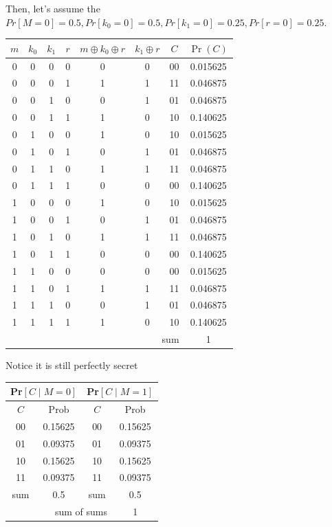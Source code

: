 Then, let's assume the $Pr[M = 0] = 0.5, Pr[k_0 = 0] = 0.5, Pr[k_1 = 0] = 0.25, Pr[r = 0] = 0.25$.

\begin{tabular}{|c|c|c|c|c|c|c|c|}
	\hline
	$m$ & $k_0$ & $k_1$ & $r$ & $m \oplus k_0 \oplus r$ & $k_1 \oplus r$ & $C$ & $\Pr(C)$ \\
	\hline
	0 & 0 & 0 & 0 & 0 & 0 & 00 & 0.015625 \\
	0 & 0 & 0 & 1 & 1 & 1 & 11 & 0.046875 \\
	0 & 0 & 1 & 0 & 0 & 1 & 01 & 0.046875 \\
	0 & 0 & 1 & 1 & 1 & 0 & 10 & 0.140625 \\
	0 & 1 & 0 & 0 & 1 & 0 & 10 & 0.015625 \\
	0 & 1 & 0 & 1 & 0 & 1 & 01 & 0.046875 \\
	0 & 1 & 1 & 0 & 1 & 1 & 11 & 0.046875 \\
	0 & 1 & 1 & 1 & 0 & 0 & 00 & 0.140625 \\
	1 & 0 & 0 & 0 & 1 & 0 & 10 & 0.015625 \\
	1 & 0 & 0 & 1 & 0 & 1 & 01 & 0.046875 \\
	1 & 0 & 1 & 0 & 1 & 1 & 11 & 0.046875 \\
	1 & 0 & 1 & 1 & 0 & 0 & 00 & 0.140625 \\
	1 & 1 & 0 & 0 & 0 & 0 & 00 & 0.015625 \\
	1 & 1 & 0 & 1 & 1 & 1 & 11 & 0.046875 \\
	1 & 1 & 1 & 0 & 0 & 1 & 01 & 0.046875 \\
	1 & 1 & 1 & 1 & 1 & 0 & 10 & 0.140625 \\
	\hline
	\multicolumn{7}{|r|}{sum} & 1 \\
	\hline
\end{tabular}

\vspace{1em}
Notice it is still perfectly secret

\begin{tabular}{|c|c||c|c|}
	\hline
	\multicolumn{2}{|c||}{Pr$[C \mid M=0]$} & \multicolumn{2}{c|}{Pr$[C \mid M=1]$} \\
	\hline
	$C$ & Prob & $C$ & Prob \\
	\hline
	00 & 0.15625 & 00 & 0.15625 \\
	01 & 0.09375 & 01 & 0.09375 \\
	10 & 0.15625 & 10 & 0.15625 \\
	11 & 0.09375 & 11 & 0.09375 \\
	\hline
	sum & 0.5 & sum & 0.5 \\
	\hline
	\multicolumn{3}{|r|}{sum of sums} & 1 \\
	\hline
\end{tabular}


